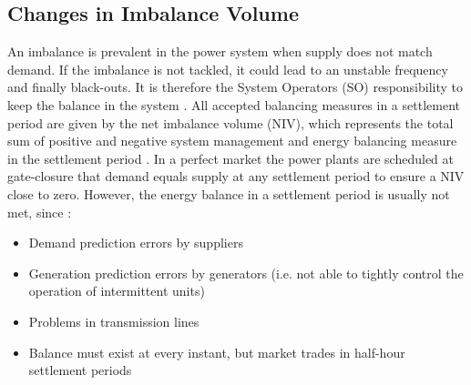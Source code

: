 \documentclass[energies,article,submit,moreauthors,pdftex]{Definitions/mdpi}
\begin{document}





\subsection{Changes in Imbalance Volume}\label{section:ImbalanceVolume}

An imbalance is prevalent in the power system when supply does not match demand. If the imbalance is not tackled, it could lead to an unstable frequency and finally black-outs. It is therefore the System Operators (SO) responsibility to keep the balance in the system \cite{ELEXON2020ELEXONBMRS}. All accepted balancing measures in a settlement period are given by the net imbalance volume (NIV), which represents the total sum of positive and negative system management and energy balancing measure in the settlement period \cite{ELEXON2020ELEXONBMRS}. In a perfect market the power plants are scheduled at gate-closure that demand equals supply at any settlement period to ensure a NIV close to zero. However, the energy balance in a settlement period is usually not met, since \cite{ELEXON2019GuidanceBritain}:
\begin{itemize}
    \item Demand prediction errors by suppliers
    \item Generation prediction errors by generators (i.e. not able to tightly control the operation of intermittent units)
    \item Problems in transmission lines
    \item Balance must exist at every instant, but market trades in half-hour settlement periods 
\end{itemize}
\end{document}
